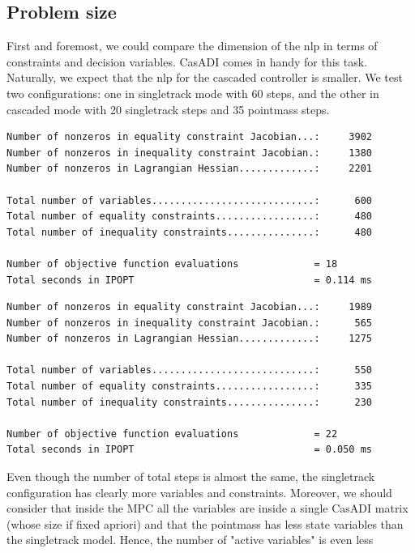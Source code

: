 \documentclass[a4paper, onecolumn, 12pt]{article}
\begin{document}
\subsection{Problem size}
First and foremost, we could compare the dimension of the nlp in terms of
constraints and decision variables. CasADI comes in handy for this task.
Naturally, we expect that the nlp for the cascaded controller is smaller. We
test two configurations: one in singletrack mode with 60 steps, and the other in
cascaded mode with 20 singletrack steps and 35 pointmass steps. \\
\begin{Verbatim}[frame=single,label=Singletrack with 60 steps,labelposition=topline,framesep=10pt]
Number of nonzeros in equality constraint Jacobian...:     3902
Number of nonzeros in inequality constraint Jacobian.:     1380
Number of nonzeros in Lagrangian Hessian.............:     2201

Total number of variables............................:      600
Total number of equality constraints.................:      480
Total number of inequality constraints...............:      480

Number of objective function evaluations             = 18
Total seconds in IPOPT                               = 0.114 ms
\end{Verbatim} 
\vspace{1mm}
\begin{Verbatim}[frame=single,label=Cascaded with 20+35 steps,labelposition=topline,framesep=10pt]
Number of nonzeros in equality constraint Jacobian...:     1989
Number of nonzeros in inequality constraint Jacobian.:      565
Number of nonzeros in Lagrangian Hessian.............:     1275

Total number of variables............................:      550
Total number of equality constraints.................:      335
Total number of inequality constraints...............:      230

Number of objective function evaluations             = 22
Total seconds in IPOPT                               = 0.050 ms
\end{Verbatim}
Even though the number of total steps is almost the same, the singletrack
configuration has clearly more variables and constraints. Moreover, we should
consider that inside the MPC all the variables are inside a single CasADI matrix
(whose size if fixed apriori) and that the pointmass has less state variables
than the singletrack model. Hence, the number of "active variables" is even less
\end{document}
